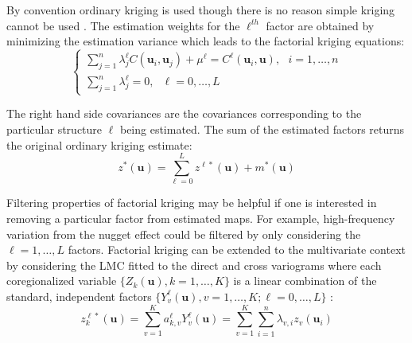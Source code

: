 By convention ordinary kriging is used though there is no reason simple kriging cannot be used \citep{hong2007improved}. The estimation weights for the $\ell^{th}$ factor are obtained by minimizing the estimation variance which leads to the factorial kriging equations:
\begin{equation*}
    \begin{cases}
        \sum_{j=1}^{n} \lambda_{j}^{\ell} C(\mathbf{u}_{i}, \mathbf{u}_{j}) + \mu^{\ell} = C^{\ell}(\mathbf{u}_{i}, \mathbf{u}), \ \ \ i=1,\dots,n \\
        \sum_{j=1}^{n} \lambda_{j}^{\ell} = 0, \ \ \ \ell = 0,\dots,L
    \end{cases}
\end{equation*}

The right hand side covariances are the covariances corresponding to the particular structure $\ell$ being estimated. The sum of the estimated factors returns the original ordinary kriging estimate:
\begin{equation*}
    z^{*}(\mathbf{u}) = \sum_{\ell=0}^{L} z^{\ell*}(\mathbf{u}) + m^{*}(\mathbf{u})
\end{equation*}

Filtering properties of factorial kriging may be helpful if one is interested in removing a particular factor from estimated maps. For example, high-frequency variation from the nugget effect could be filtered by only considering the $\ell=1,\dots,L$ factors. Factorial kriging can be extended to the multivariate context by considering the LMC fitted to the direct and cross variograms where each coregionalized variable $\{Z_{k}(\mathbf{u}), k=1,\dots,K\}$ is a linear combination of the standard, independent factors $\{Y_{v}^{\ell}(\mathbf{u}), v=1,\dots,K; \ell=0,\dots,L\}$ \citep{wackernagel1988geostatistical}:
\begin{equation*}
    z^{\ell*}_{k}(\mathbf{u}) = \sum_{v=1}^{K} a_{k,v}^{\ell} Y^{\ell}_{v}(\mathbf{u}) = \sum_{v=1}^{K}\sum_{i=1}^{n} \lambda_{v,i} z_{v}(\mathbf{u}_{i})
\end{equation*}


